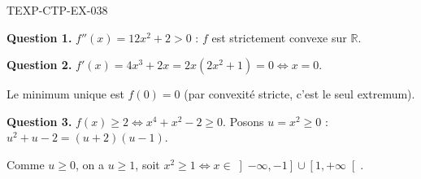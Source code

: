 \begin{corrige}{TEXP-CTP-EX-038}

\textbf{Question 1.} $f''(x) = 12x^2 + 2 > 0$ : $f$ est strictement convexe sur $\mathbb{R}$.


\textbf{Question 2.} $f'(x) = 4x^3 + 2x = 2x(2x^2+1) = 0 \iff x = 0$.

Le minimum unique est $f(0) = 0$ (par convexité stricte, c'est le seul extremum).

\textbf{Question 3.} $f(x) \geq 2 \iff x^4 + x^2 - 2 \geq 0$. Posons $u = x^2 \geq 0$ : $u^2 + u - 2 = (u+2)(u-1)$.

Comme $u \geq 0$, on a $u \geq 1$, soit $x^2 \geq 1 \iff x \in \left]-\infty, -1\right] \cup \left[1, +\infty\right[$.

\end{corrige}
